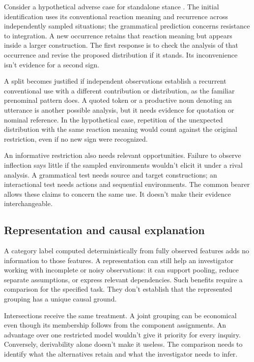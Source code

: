 \documentclass[12pt]{article}
\begin{document}
Consider a hypothetical adverse case for standalone stance .
The initial identification uses its conventional reaction meaning and
recurrence across independently sampled situations; the grammatical
prediction concerns resistance to integration. A new occurrence retains
that reaction meaning but appears inside a larger construction. The
first response is to check the analysis of that occurrence and revise
the proposed distribution if it stands. Its inconvenience isn't evidence
for a second sign.

A split becomes justified if independent observations establish a
recurrent conventional use with a different contribution or distribution,
as the familiar prenominal pattern does. A quoted token or a productive
noun denoting an utterance is another possible analysis, but it needs
evidence for quotation or nominal reference. In the hypothetical case,
repetition of the unexpected distribution with the same reaction meaning
would count against the original restriction, even if no new sign
were recognized.

An informative restriction also needs relevant opportunities. Failure
to observe inflection says little if the sampled environments wouldn't
elicit it under a rival analysis. A grammatical test needs source and
target constructions; an interactional test needs actions and sequential
environments. The common bearer allows these claims to concern the
same use. It doesn't make their evidence interchangeable.

\subsection{Representation and causal explanation}

A category label computed deterministically from fully observed features
adds no information to those features. A representation can still
help an investigator working with incomplete or noisy observations:
it can support pooling, reduce separate assumptions, or express relevant
dependencies. Such benefits require a comparison for the specified task.
They don't establish that the represented grouping has a unique causal
ground.

Intersections receive the same treatment. A joint grouping can be
economical even though its membership follows from the component
assignments. An advantage over one restricted model wouldn't give it
priority for every inquiry. Conversely, derivability alone doesn't make
it useless. The comparison needs to identify what the alternatives retain
and what the investigator needs to infer.
\end{document}
